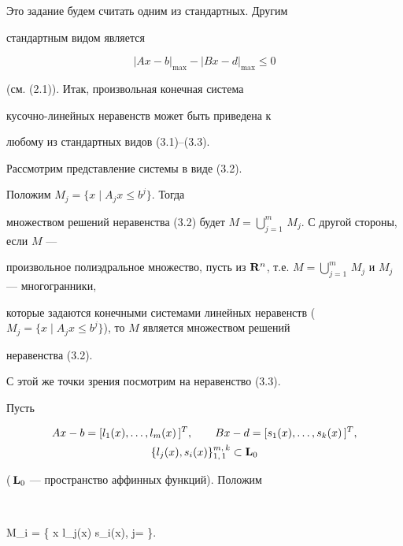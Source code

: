 Это задание будем считать одним из стандартных. Другим


стандартным видом является


\begin{equation}


|Ax - b|_{\max} - |Bx - d|_{\max} \le 0


\end{equation}


(см. (2.1)). Итак, произвольная конечная система


кусочно-линейных неравенств может быть приведена к \


любому из стандартных видов (3.1)--(3.3).





Рассмотрим представление системы в виде (3.2).


Положим $M_j =\{ x \mid A_j x \le b^j \}$. Тогда


множеством решений неравенства (3.2) будет $M =


\bigcup\limits_{j=1}^m\, M_j$. С другой стороны, если $M$ ---


произвольное полиэдральное множество, пусть из $\R^n$, т.е. $M =


\bigcup\limits_{j=1}^m\, M_j$ и $M_j$ --- многогранники,


которые задаются конечными системами линейных неравенств ($M_j


= \{ x \mid A_j x \le b^j \}$), то $M$ является множеством решений


неравенства (3.2).





С этой же точки зрения посмотрим на неравенство (3.3).


Пусть


\begin{gather*}


Ax -b = [\nk{l_1 (x)}{l_m (x)} \,]^T,\qquad


Bx -d = [\nk{s_1 (x)}{s_k (x)} \,]^T,\\


\{ l_j(x), s_i(x) \}_{1,\,1}^{m,\,k} \su \bold L_0


\end{gather*}


(\,$\bold L_0$ --- пространство аффинных функций). Положим


$$


M_i = \{ x \mid l_j(x) \le s_i(x),\; j= \}.


